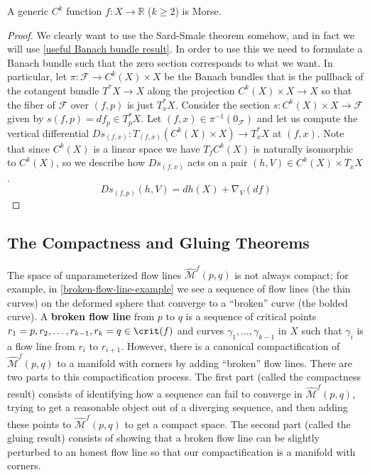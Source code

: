 \begin{prop}
A generic $C^k$ function $f : X \rightarrow \mathbb R$ ($k \geq 2$) is Morse.
\end{prop}
\begin{proof}
We clearly want to use the Sard-Smale theorem somehow, and in fact we will use \cref{useful Banach bundle result}. In order to use this we need to formulate a Banach bundle such that the zero section corresponds to what we want. In particular, let $\pi : \mathcal F \rightarrow C^k(X) \times X$ be the Banach bundles that is the pullback of the cotangent bundle $T^* X \rightarrow X$ along the projection $C^k(X) \times X \rightarrow X$ so that the fiber of $\mathcal F$ over $(f,p)$ is just $T_x^* X$. Consider the section $s : C^k(X) \times X \rightarrow \mathcal F$ given by $s(f,p) = df_p \in T_p^* X$. Let $(f,x) \in \pi^{-1}(0_{\mathcal F})$ and let us compute the vertical differential $Ds_{(f,x)} : T_{(f,x)} (C^k(X) \times X) \rightarrow T_x^*X$ at $(f,x)$. Note that since $C^k(X)$ is a linear space we have $T_f C^k(X)$ is naturally isomorphic to $C^k(X)$, so we describe how $Ds_{(f,x)}$ acts on a pair $(h,V) \in C^k(X) \times T_x X$.
\[ Ds_{(f,p)}(h,V) = dh(X) + \nabla_V(df) \]

\unfinished
\end{proof}




\subsection{The Compactness and Gluing Theorems}
\label{The Compactness and Gluing Theorems}

The space of unparameterized flow lines $\widehat{\mathcal M}^f(p,q)$ is not always compact; for example, in \cref{broken-flow-line-example} we see a sequence of flow lines (the thin curves) on the deformed sphere that converge to a ``broken'' curve (the bolded curve). A \textbf{broken flow line} from $p$ to $q$ is a sequence of critical points $r_1=p,r_2,\ldots,r_{k-1},r_k=q \in \crit(f)$ and curves $\gamma_1,\ldots,\gamma_{k-1}$ in $X$ such that $\gamma_i$ is a flow line from $r_i$ to $r_{i+1}$. However, there is a canonical compactification of $\widehat{\mathcal M}^f(p,q)$ to a manifold with corners by adding ``broken'' flow lines. There are two parts to this compactification process. The first part (called the compactness result) consists of identifying how a sequence can fail to converge in $\widehat{\mathcal M}^f(p,q)$, trying to get a reasonable object out of a diverging sequence, and then adding these points to $\widehat{\mathcal M}^f(p,q)$ to get a compact space. The second part (called the gluing result) consists of showing that a broken flow line can be slightly perturbed to an honest flow line so that our compactification is a manifold with corners.

